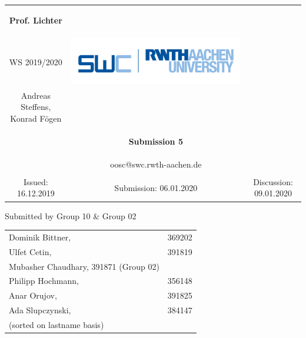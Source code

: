 \begin{tabular}{ccc}
		\begin{large} \textbf{Prof. Lichter} \end{large} &
		
		\begin{minipage}[H]{3.5cm}
			\centering
			\begin{large} OOSC \end{large} \\
			\begin{large} WS 2019/2020 \end{large}
		\end{minipage} &
		
		\begin{minipage}[H]{4cm}
			\includegraphics[keepaspectratio,width=\textwidth,angle=0]{images/swc.png}
		\end{minipage} \\
		Andreas Steffens, Konrad F\"ogen &  &  \\
		& \begin{huge} \textbf{Submission 5} \end{huge}&  \\
		& oosc@swc.rwth-aachen.de &  \\
		& & \\
		Issued: 16.12.2019 &
		Submission: 06.01.2020 &
		Discussion: 09.01.2020 \\
	\end{tabular}
	\newline \newline \newline
	\begin{center}
		Submitted by Group 10 & Group 02
		
		\begin{tabular}{ll}
			Dominik Bittner, & 369202 \\
			Ulfet Cetin, & 391819\\
			Mubasher Chaudhary, 391871 (Group 02)& \\
			Philipp Hochmann, & 356148 \\
			Anar Orujov, & 391825\\
			Ada Slupczynski, & 384147\\
			(sorted on lastname basis)
		\end{tabular}
	\end{center}
